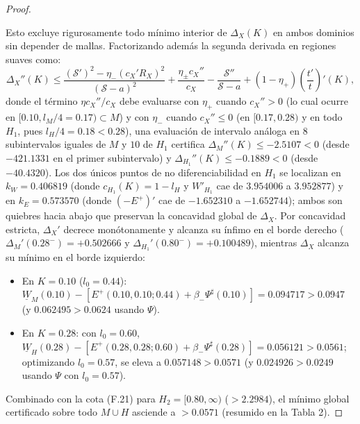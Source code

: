 \documentclass[11pt,letterpaper]{article}
\theoremstyle{plain}
\begin{document}
\begin{proof}
\begin{itemize}
\end{itemize}
Esto excluye rigurosamente todo mínimo interior de $\Delta_X(K)$ en ambos dominios sin depender de mallas. Factorizando además la segunda derivada en regiones suaves como:
\[
\Delta_X''(K) \le \frac{(\mathcal{S}')^2 - \eta_-(c_X' R_X)^2}{(\mathcal{S}-a)^2} + \frac{\eta_{\pm} c_X''}{c_X} - \frac{\mathcal{S}''}{\mathcal{S}-a} + (1-\eta_+)\left(\frac{t'}{t}\right)'(K),
\]
donde el término $\eta c_X''/c_X$ debe evaluarse con \textbf{$\eta_+$} cuando $c_X'' > 0$ (lo cual ocurre en $[0.10, l_M/4 = 0.17)\subset M$) y con \textbf{$\eta_-$} cuando $c_X'' \le 0$ (en $[0.17, 0.28)$ y en todo $H_1$, pues $l_H/4=0.18 < 0.28$), una evaluación de intervalo análoga en $8$ subintervalos iguales de $M$ y $10$ de $H_1$ certifica $\Delta_M''(K)\le -2.5107 < 0$ (desde $-421.1331$ en el primer subintervalo) y $\Delta_{H_1}''(K)\le -0.1889 < 0$ (desde $-40.4320$). Los dos únicos puntos de no diferenciabilidad en $H_1$ se localizan en $k_W = 0.406819$ (donde $c_{H_1}(K)=1-l_H$ y $W'_{H_1}$ cae de $3.954006$ a $3.952877$) y en $k_E = 0.573570$ (donde $(-E^+)'$ cae de $-1.652310$ a $-1.652744$); ambos son quiebres hacia abajo que preservan la concavidad global de $\Delta_X$. Por concavidad estricta, $\Delta_X'$ decrece monótonamente y alcanza su ínfimo en el borde derecho ($\Delta_M'(0.28^-)=+0.502666$ y $\Delta_{H_1}'(0.80^-)=+0.100489$), mientras $\Delta_X$ alcanza su mínimo en el borde izquierdo:
\begin{itemize}
\item En $K=0.10$ ($l_0=0.44$): $\underline{W}_M(0.10)-[E^+(0.10,0.10;0.44)+\beta_-\Psi^\sharp(0.10)]=0.094717>0.0947$ (y $0.062495>0.0624$ usando $\Psi$).
\item En $K=0.28$: con $l_0=0.60$, $\underline{W}_H(0.28)-[E^+(0.28,0.28;0.60)+\beta_-\Psi^\sharp(0.28)]=0.056121>0.0561$; optimizando $l_0=0.57$, se eleva a $0.057148>0.0571$ (y $0.024926>0.0249$ usando $\Psi$ con $l_0=0.57$).
\end{itemize}
Combinado con la cota (F.21) para $H_2=[0.80,\infty)$ ($>2.2984$), el mínimo global certificado sobre todo $M\cup H$ asciende a $>0.0571$ (resumido en la Tabla 2).
\end{proof}
\end{document}
